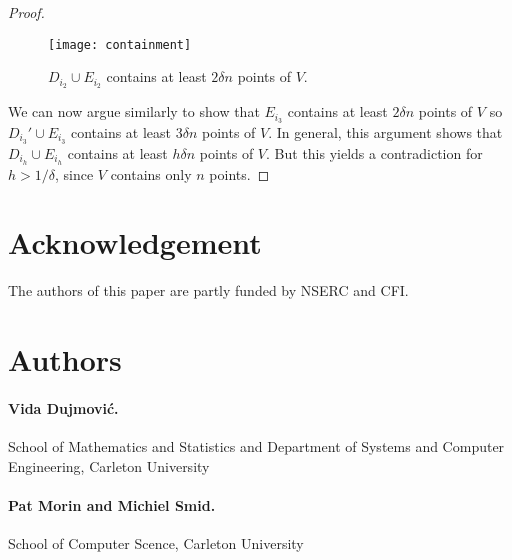 \documentclass{patmorin}
\begin{document}
\begin{proof}
   \begin{figure}
     \begin{center}
       \texttt{[image: containment]}
     \end{center}
     \caption{$D_{i_2}\cup E_{i_2}$ contains at least $2\delta n$ 
              points of $V$.}
   \end{figure}

   We can now argue similarly to show that $E_{i_3}$ contains at least
   $2\delta n$ points of $V$ so $D_{i_3}'\cup E_{i_3}$ contains at least
   $3\delta n$ points of $V$.  In general, this argument shows that
   $D_{i_h}\cup E_{i_h}$ contains at least $h\delta n$ points of $V$.
   But this yields a contradiction for $h> 1/\delta$, since $V$
   contains only $n$ points.
\end{proof}



\section*{Acknowledgement}

The authors of this paper are partly funded by NSERC and CFI.

\section*{Authors}

\paragraph{Vida Dujmovi\'c.}
School of Mathematics and Statistics and Department of Systems and Computer Engineering, Carleton University

\paragraph{Pat Morin and Michiel Smid.}
School of Computer Scence, Carleton University




\end{document}
